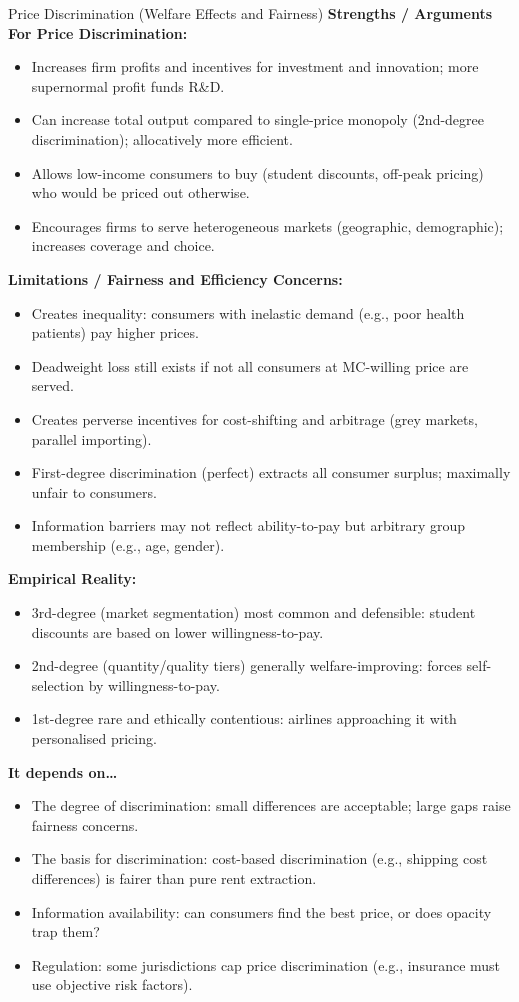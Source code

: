 \documentclass[11pt, a4paper, twoside]{book}
\begin{document}
\begin{evaluation}{Price Discrimination (Welfare Effects and Fairness)}
\textbf{Strengths / Arguments For Price Discrimination:}
\begin{itemize}[leftmargin=*, nosep]
\item Increases firm profits and incentives for investment and innovation; more supernormal profit funds R\&D.
\item Can increase total output compared to single-price monopoly (2nd-degree discrimination); allocatively more efficient.
\item Allows low-income consumers to buy (student discounts, off-peak pricing) who would be priced out otherwise.
\item Encourages firms to serve heterogeneous markets (geographic, demographic); increases coverage and choice.
\end{itemize}
\textbf{Limitations / Fairness and Efficiency Concerns:}
\begin{itemize}[leftmargin=*, nosep]
\item Creates inequality: consumers with inelastic demand (e.g., poor health patients) pay higher prices.
\item Deadweight loss still exists if not all consumers at MC-willing price are served.
\item Creates perverse incentives for cost-shifting and arbitrage (grey markets, parallel importing).
\item First-degree discrimination (perfect) extracts all consumer surplus; maximally unfair to consumers.
\item Information barriers may not reflect ability-to-pay but arbitrary group membership (e.g., age, gender).
\end{itemize}
\textbf{Empirical Reality:}
\begin{itemize}[leftmargin=*, nosep]
\item 3rd-degree (market segmentation) most common and defensible: student discounts are based on lower willingness-to-pay.
\item 2nd-degree (quantity/quality tiers) generally welfare-improving: forces self-selection by willingness-to-pay.
\item 1st-degree rare and ethically contentious: airlines approaching it with personalised pricing.
\end{itemize}
\textbf{It depends on\ldots}
\begin{itemize}[leftmargin=*, nosep]
\item The degree of discrimination: small differences are acceptable; large gaps raise fairness concerns.
\item The basis for discrimination: cost-based discrimination (e.g., shipping cost differences) is fairer than pure rent extraction.
\item Information availability: can consumers find the best price, or does opacity trap them?
\item Regulation: some jurisdictions cap price discrimination (e.g., insurance must use objective risk factors).
\end{itemize}
\end{evaluation}
\end{document}
